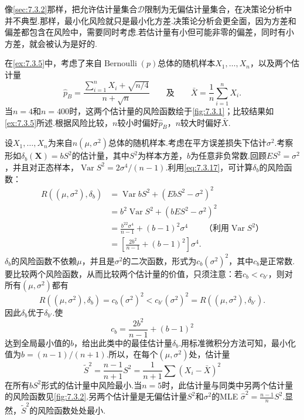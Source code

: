像\autoref{sec:7.3.2}那样，把允许估计量集合$\mathcal D$限制为无偏估计量集合，在决策论分析中并不典型.那样，最小化风险就只是最小化方差.决策论分析会更全面，因为方差和偏差都包含在风险中，需要同时考虑.若估计量有小但可能非零的偏差，同时有小方差，就会被认为是好的.
\begin{example}[二项分布的风险函数]\label{ex:7.3.25}
在\autoref{ex:7.3.5}中，考虑了来自$\operatorname{Bernoulli}(p)$总体的随机样本$X_1,\ldots,X_n$，以及两个估计量
$$\widehat p_B=\frac{\sum_{i=1}^nX_i+\sqrt{n/4}}{n+\sqrt n}\qquad\text{及}\qquad\bar X=\frac1n\sum_{i=1}^nX_i.$$
当$n=4$和$n=400$时，这两个估计量的风险函数绘于\autoref{fig:7.3.1}；比较结果如\autoref{ex:7.3.5}所述.根据风险比较，$n$较小时偏好$\widehat p_B$，$n$较大时偏好$\bar X$.
\end{example}
\begin{example}[正态方差估计的风险]\label{ex:7.3.26}
设$X_1,\ldots,X_n$为来自$n(\mu,\sigma^2)$总体的随机样本.考虑在平方误差损失下估计$\sigma^2$.考察形如$\delta_b(\boldsymbol X)=bS^2$的估计量，其中$S^2$为样本方差，$b$为任意非负常数.回顾$ES^2=\sigma^2$，并且对正态样本，$\operatorname{Var}S^2=2\sigma^4/(n-1)$.利用\eqref{eq:7.3.17}，可计算$\delta_b$的风险函数：
\begin{align*}
R((\mu,\sigma^2),\delta_b)&=\operatorname{Var}bS^2+(EbS^2-\sigma^2)^2\\
&=b^2\operatorname{Var}S^2+(bES^2-\sigma^2)^2\\
&=\frac{b^22\sigma^4}{n-1}+(b-1)^2\sigma^4\qquad\text{（利用$\operatorname{Var}S^2$）}\\
&=\left[\frac{2b^2}{n-1}+(b-1)^2\right]\sigma^4.
\end{align*}
$\delta_b$的风险函数不依赖$\mu$，并且是$\sigma^2$的二次函数，形式为$c_b(\sigma^2)^2$，其中$c_b$是正常数.要比较两个风险函数，从而比较两个估计量的价值，只须注意：若$c_b<c_{b'}$，则对所有$(\mu,\sigma^2)$都有
$$R((\mu,\sigma^2),\delta_b)=c_b(\sigma^2)^2<c_{b'}(\sigma^2)^2=R((\mu,\sigma^2),\delta_{b'}).$$
因此$\delta_b$优于$\delta_{b'}$.使
\begin{equation}\label{eq:7.3.18}
c_b=\frac{2b^2}{n-1}+(b-1)^2
\end{equation}
达到全局最小值的$b$，给出此类中的最佳估计量$\delta_b$.用标准微积分方法可知，最小化值为$b=(n-1)/(n+1)$.所以，在每个$(\mu,\sigma^2)$处，估计量
$$\widetilde S^2=\frac{n-1}{n+1}S^2=\frac1{n+1}\sum(X_i-\bar X)^2$$
在所有$bS^2$形式的估计量中风险最小.当$n=5$时，此估计量与同类中另两个估计量的风险函数见\autoref{fig:7.3.2}.另两个估计量是无偏估计量$S^2$和$\sigma^2$的MLE $\widehat\sigma^2=\frac{n-1}nS^2$.显然，$\widetilde S^2$的风险函数处处最小.
\end{example}
